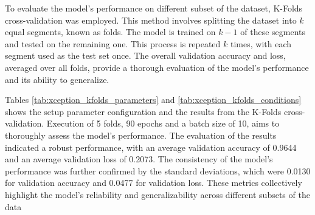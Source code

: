 To evaluate the model's performance on different subset of the dataset, K-Folds cross-validation was employed. This method involves splitting the dataset into $k$ equal segments, known as folds. The model is trained on $k-1$ of these segments and tested on the remaining one. This process is repeated $k$ times, with each segment used as the test set once. The overall validation accuracy and loss, averaged over all folds, provide a thorough evaluation of the model's performance and its ability to generalize.

Tables \ref{tab:xception_kfolds_parameters} and \ref{tab:xception_kfolds_conditions} shows the setup parameter configuration and the results from the K-Folds cross-validation. Execution of 5 folds, 90 epochs and a batch size of 10, aims to thoroughly assess the model's performance. The evaluation of the results indicated a robust performance, with an average validation accuracy of 0.9644 and an average validation loss of 0.2073. The consistency of the model's performance was further confirmed by the standard deviations, which were 0.0130 for validation accuracy and 0.0477 for validation loss. These metrics collectively highlight the model's reliability and generalizability across different subsets of the data

